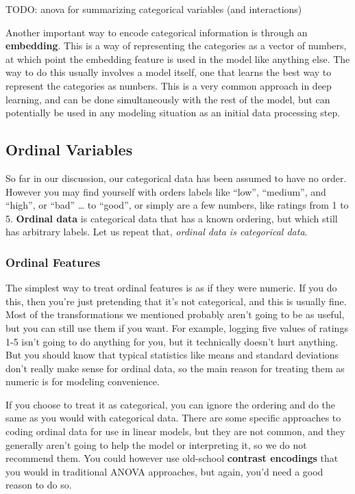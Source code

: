 \documentclass[
  letterpaper,
]{krantz}
\begin{document}
TODO: anova for summarizing categorical variables (and interactions)

Another important way to encode categorical information is through an
\textbf{embedding}. This is a way of representing the categories as a
vector of numbers, at which point the embedding feature is used in the
model like anything else. The way to do this usually involves a model
itself, one that learns the best way to represent the categories as
numbers. This is a very common approach in deep learning, and can be
done simultaneously with the rest of the model, but can potentially be
used in any modeling situation as an initial data processing step.

\subsection{Ordinal Variables}\label{sec-data-ordinal}

So far in our discussion, our categorical data has been assumed to have
no order. However you may find yourself with orders labels like ``low'',
``medium'', and ``high'', or ``bad'' \ldots{} to ``good'', or simply are
a few numbers, like ratings from 1 to 5. \textbf{Ordinal data} is
categorical data that has a known ordering, but which still has
arbitrary labels. Let us repeat that, \emph{ordinal data is categorical
data}.

\subsubsection{Ordinal Features}\label{ordinal-features}

The simplest way to treat ordinal features is as if they were numeric.
If you do this, then you're just pretending that it's not categorical,
and this is usually fine. Most of the transformations we mentioned
probably aren't going to be as useful, but you can still use them if you
want. For example, logging five values of ratings 1-5 isn't going to do
anything for you, but it technically doesn't hurt anything. But you
should know that typical statistics like means and standard deviations
don't really make sense for ordinal data, so the main reason for
treating them as numeric is for modeling convenience.

If you choose to treat it as categorical, you can ignore the ordering
and do the same as you would with categorical data. There are some
specific approaches to coding ordinal data for use in linear models, but
they are not common, and they generally aren't going to help the model
or interpreting it, so we do not recommend them. You could however use
old-school \textbf{contrast encodings} that you would in traditional
ANOVA approaches, but again, you'd need a good reason to do so.
\end{document}

